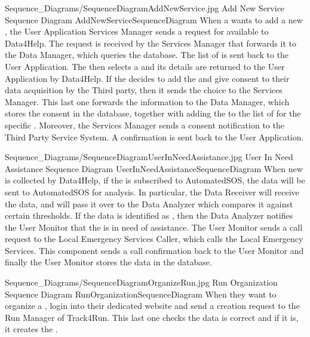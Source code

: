 \documentclass[../../DD.tex]{subfiles}
\begin{document}
	\image {13cm} {Sequence_Diagrams/SequenceDiagramAddNewService.jpg} {Add New Service Sequence Diagram} {AddNewServiceSequenceDiagram}
	When a  wants to add a new , the User Application Services Manager sends a request for available  to Data4Help. The request is received by the Services Manager that forwards it to the Data Manager, which queries the database. The list of  is sent back to the User Application. The  then selects a  and its details are returned to the User Application by Data4Help. If the  decides to add the  and give consent to their data acquisition by the Third party, then it sends the choice to the Services Manager. This last one forwards the information to the Data Manager, which stores the consent in the database, together with adding the  to the list of  for the specific . Moreover, the Services Manager sends a consent notification to the Third Party Service System. A confirmation is sent back to the User Application.



	\image {13cm} {Sequence_Diagrams/SequenceDiagramUserInNeedAssistance.jpg} {User In Need Assistance Sequence Diagram} {UserInNeedAssistanceSequenceDiagram}
	When new  is collected by Data4Help, if the  is subscribed to AutomatedSOS, the data will be sent to AutomatedSOS for analysis. In particular, the Data Receiver will receive the data, and will pass it over to the Data Analyzer which compares it against certain thresholds. If the data is identified as , then the Data Analyzer notifies the User Monitor that the  is in need of assistance. The User Monitor sends a call request to the Local Emergency Services Caller, which calls the Local Emergency Services. This component sends a call confirmation back to the User Monitor and finally the User Monitor stores the  data in the database.
	

	\image {13cm} {Sequence_Diagrams/SequenceDiagramOrganizeRun.jpg} {Run Organization Sequence Diagram} {RunOrganizationSequenceDiagram}
	When they want to organize a ,  login into their dedicated website and send a  creation request to the Run Manager of Track4Run. This last one checks the  data is correct and if it is, it creates the .
\end{document}
